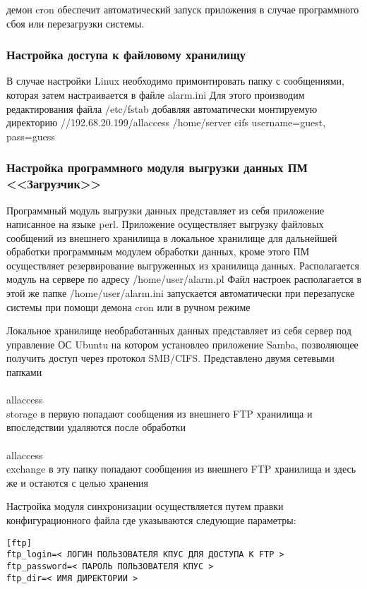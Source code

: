\documentclass[12pt]{article}[a4paper,14pt,russian]
\begin{document}
	демон cron обеспечит автоматический запуск приложения в случае программного сбоя или перезагрузки системы.


	\subsubsection{Настройка доступа к файловому хранилищу}
	В случае настройки Linux необходимо примонтировать папку с сообщениями, которая затем настраивается в файле alarm.ini
	Для этого производим редактирования файла /etc/fstab добавляя автоматически монтируемую директорию
	//192.68.20.199/allaccess /home/server cifs username=guest, pass=guess
	\subsubsection{Настройка программного модуля выгрузки данных ПМ <<Загрузчик>>}
	Программный модуль выгрузки данных представляет из себя приложение написанное на языке perl. Приложение осуществляет выгрузку файловых сообщений из внешнего хранилища в локальное хранилище для дальнейшей обработки программным модулем обработки данных, кроме этого ПМ осуществляет резервирование выгруженных из хранилища данных.
	Располагается модуль на сервере по адресу
	/home/user/alarm.pl
	Файл настроек располагается в этой же папке 
	/home/user/alarm.ini
	запускается автоматически при перезапуске системы при помощи демона cron или в ручном режиме
	 \newline
    \newline
  

	Локальное хранилище необработанных данных представляет из себя сервер под управление ОС Ubuntu на котором установлео приложение Samba, позволяющее  получить доступ через протокол SMB/CIFS. Представлено двумя сетевыми папками
	\\<ip адрес сервера>\\allaccess\\storage
	в первую попадают сообщения из внешнего FTP хранилища и впоследствии удаляются после обработки
	\\<ip адрес сервера>\\allaccess\\exchange
	в эту папку попадают сообщения из внешнего FTP хранилища и здесь же и остаются
	с целью хранения
 
Настройка модуля синхронизации осуществляется путем правки конфигурационного файла где указываются следующие параметры:
\begin{verbatim}
[ftp]
ftp_login=< ЛОГИН ПОЛЬЗОВАТЕЛЯ КПУС ДЛЯ ДОСТУПА К FTP >
ftp_password=< ПАРОЛЬ ПОЛЬЗОВАТЕЛЯ КПУС >
ftp_dir=< ИМЯ ДИРЕКТОРИИ >
\end{verbatim}
\end{document}
